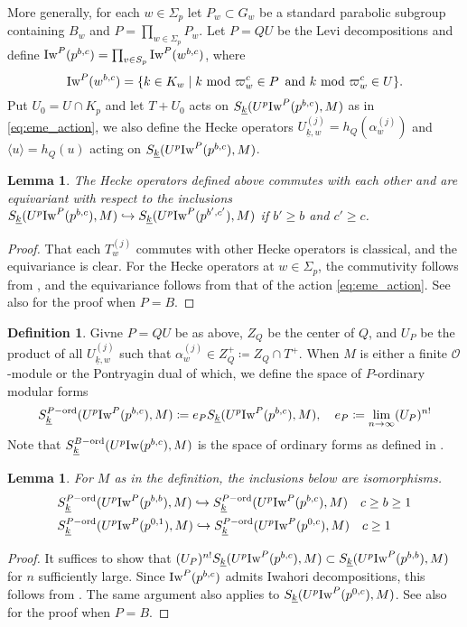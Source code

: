 \documentclass[leqno]{amsart}
\newcommand{\wt}[1]{\underline{ #1 }}
\newcommand{\Iw}{\textnormal{Iw}}
\newcommand{\ord}{\textnormal{ord}}
\newcommand{\oo}{\mathcal{O}} %
\newtheorem{lem}[thm]{Lemma}
\theoremstyle{definition}
\newtheorem{defn}[thm]{Definition}
\theoremstyle{remark}
\begin{document}
More generally, 
for each $w\in \Sigma_p$ let $P_w\subset G_w$
be a standard parabolic subgroup containing $B_w$
and $P=\prod_{w\in \Sigma_p}P_w$.
Let $P=QU$ be the Levi decompositions and define
$\Iw^P(p^{b,c})=\prod_{v\in S_p}\Iw^P(w^{b,c})$, where
\[
	\Iw^P(w^{b,c})=
	\{
	k\in K_w\mid 
	k\text{ mod } \varpi_w^c \in P\,\text{ and }
	k\text{ mod } \varpi_w^c \in U
	\}.
\]
Put $U_0=U\cap K_p$
and let $T+U_0$ acts on  $S_{\wt{k}}(U^p\Iw^P(p^{b,c}),M)$
as in \eqref{eq:eme_action},
we also define
the Hecke operators 
$U_{\wt{k},w}^{(j)}=h_Q(\alpha_w^{(j)})$
and $\langle u\rangle=h_Q(u)$
acting on $S_{\wt{k}}(U^p\Iw^P(p^{b,c}),M)$.

\begin{lem}
The Hecke operators defined above commutes with each other
and are equivariant with respect to the inclusions
$ S_{\wt{k}}(U^p\Iw^P(p^{b,c}),M)\hookrightarrow
S_{\wt{k}}(U^p\Iw^P(p^{b',c'}),M)$
if $b'\geq b$ and $c'\geq c$.
\end{lem}
\begin{proof}
That each $T_w^{(j)}$ commutes with other Hecke operators is classical,
and the equivariance is clear.
For the Hecke operators at  $w\in \Sigma_p$,
the commutivity follows from \cite[Lem 3.1.4]{emeI},
and the equivariance follows from 
that of the action \eqref{eq:eme_action}.
See also \cite[Lem 2.10]{ger} for the proof when $P=B$.
\end{proof}



\begin{defn}
	Givne $P=QU$ be as above,
	$Z_Q$ be the center of $Q$,
	and $U_P$ be the product of all  $U_{\wt{k},w}^{(j)}$
	such that 
	$\alpha_{w}^{(j)}\in Z_Q^+\coloneqq Z_Q\cap T^+$.
	When $M$ is either a finite  $\oo$-module
	or the Pontryagin dual of which,
	we define the space of $P$-ordinary modular forms
	\[
	S_{\wt{k}}^{P-\ord}(U^p\Iw^P(p^{b,c}),M)\coloneqq
		e_PS_{\wt{k}}(U^p\Iw^P(p^{b,c}),M),\quad
		e_P\coloneqq\lim_{n\to \infty}(U_P)^{n!}
	\]
	Note that
	$S_{\wt{k}}^{B-\ord}(U^p\Iw(p^{b,c}),M)$ 
	is the space of ordinary forms as defined in 
	\cite[Def 2.13]{ger}.
\end{defn}

\begin{lem}
	For $M$ as in the definition,
	the inclusions below are isomorphisms.
	\begin{align*}
	&S_{\wt{k}}^{P-\ord}(U^p\Iw^P(p^{b,b}),M)\hookrightarrow	
	S_{\wt{k}}^{P-\ord}(U^p\Iw^P(p^{b,c}),M)\quad c\geq b\geq 1\\
	&S_{\wt{k}}^{P-\ord}(U^p\Iw^P(p^{0,1}),M)\hookrightarrow	
	S_{\wt{k}}^{P-\ord}(U^p\Iw^P(p^{0,c}),M)\quad c\geq 1
	\end{align*}
\end{lem}
\begin{proof}
	It suffices to show that 
	$(U_P)^{n!}S_{\wt{k}}(U^p\Iw^P(p^{b,c}),M)
	\subset S_{\wt{k}}(U^p\Iw^P(p^{b,b}),M)$
	for $n$ sufficiently large. 
	Since $\Iw^P(p^{b,c})$ admits Iwahori decompositions,
	this follows from \cite[Lem 3.3.2]{emeI}.
	The same argument also applies to 
	$S_{\wt{k}}(U^p\Iw^P(p^{0,c}),M)$.
	See also \cite[Lem 2.19]{ger} for the proof when $P=B$.
\end{proof}
\end{document}
